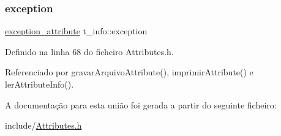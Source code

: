 \mbox{\label{uniont__info_ad8bba19df869f74ce8cb48ae37c3fff4}} 
\subsubsection{\texorpdfstring{exception}{exception}}
{\footnotesize\ttfamily \hyperlink{structexception__attribute}{exception\+\_\+attribute} t\+\_\+info\+::exception}



Definido na linha 68 do ficheiro Attributes.\+h.



Referenciado por gravar\+Arquivo\+Attribute(), imprimir\+Attribute() e ler\+Attribute\+Info().



A documentação para esta união foi gerada a partir do seguinte ficheiro\+:\begin{DoxyCompactItemize}
\item 
include/\hyperlink{Attributes_8h}{Attributes.\+h}\end{DoxyCompactItemize}
